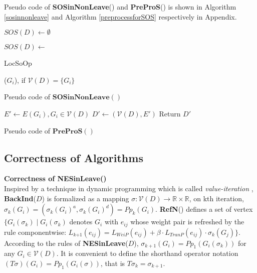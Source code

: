 \documentclass{acm_proc_article-sp}
\begin{document}
Pseudo code of \textbf{SOSinNonLeave}() and \textbf{PreProS}() is shown in Algorithm \ref{sosinnonleave} and Algorithm \ref{preprocessforSOS} respectively in Appendix.
\begin{algorithm}[!h]
\scriptsize
 $\textit{SOS}(D)\leftarrow \emptyset$\;
 {
 $\textit{SOS}(D)\leftarrow $\begin{bf}LocSoOp\end{bf}($G_{\textit{i}}$), if $\mathcal{V}(D)=\{G_{\textit{i}}\}$\;
 }
 \caption{Pseudo code of $\mathbf{SOSinNonLeave}()$}
 \label{sosinnonleave}
\end{algorithm}
\begin{algorithm}[!h]
\scriptsize
 $E'\leftarrow E(G_{\textit{i}}),G_{\textit{i}}\in \mathcal{V}(D)$\;
 $D'\leftarrow (\mathcal{V}(D), E')$\;
 Return $D'$\;
 \caption{Pseudo code of $\mathbf{PreProS}()$}
 \label{preprocessforSOS}
\end{algorithm}

\subsection{Correctness of Algorithms}

\textbf{Correctness of \textbf{NESinLeave}()}\\
Inspired by a technique in dynamic programming which is called \textit{value-iteration} \cite{vander, ls}, \textbf{BackInd}($D$) is formalized as a mapping $\sigma: \mathcal{V}(D)\rightarrow \mathds{R}\times \mathds{R}$, on kth iteration, $\sigma_{k}(G_{\textit{i}})=(\sigma_{k}(G_{\textit{i}})^a, \sigma_{k}(G_{\textit{i}})^d)=Pp_{k}(G_{\textit{i}})$. \textbf{RefN}() defines a set of vertex $\{G_{\textit{i}}(\sigma_{k})\mid G_{\textit{i}}(\sigma_{k})$ denotes $G_{\textit{i}}$ with $e_{\textit{ij}}$ whose weight pair is refreshed by the rule componentwise: $L_{\textit{k+1}}(e_{\textit{ij}})=L_{\textit{WeiP}}(e_{\textit{ij}})+ \beta\cdot L_{\textit{TranP}}(e_{\textit{ij}})\cdot \sigma_{k}(G_{\textit{j}})\}$. According to the rules of \textbf{NESinLeave}($D$),  $\sigma_{k+1}(G_{\textit{i}})=Pp_{1}(G_{i}(\sigma_{k}))$ for any $G_{\textit{i}}\in \mathcal{V}(D)$. It is convenient to define the shorthand operator notation $(T\sigma)(G_{\textit{i}})=Pp_{1}(G_{i}(\sigma))$, that is $T\sigma_{k}=\sigma_{k+1}$.
\end{document}
